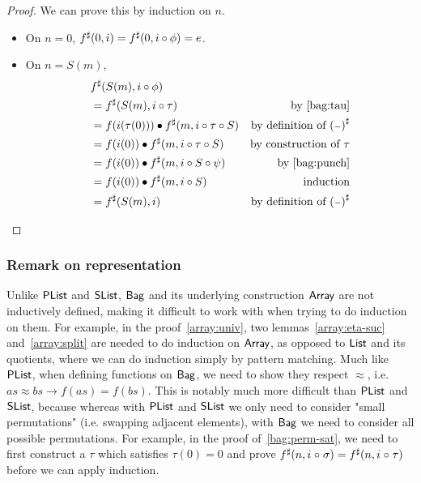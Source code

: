 \begin{proof}
    We can prove this by induction on $n$.
    \begin{itemize}
        \item On $n = 0$, $\ext{f}(0, i) \id \ext{f}(0, i \circ \phi) = e$.
        \item On $n = S(m)$,
              \begin{align*}
                   & \ext{f}(S(m), i \circ \phi)                                                                       \\
                   & = \ext{f}(S(m), i \circ \tau)                          & \text{by~\cref{bag:tau}}                 \\
                   & = f(i(\tau(0))) \mult \ext{f}(m, i \circ \tau \circ S) & \text{by definition of $\ext{(\blank)}$} \\
                   & = f(i(0)) \mult \ext{f}(m, i \circ \tau \circ S)       & \text{by construction of $\tau$}         \\
                   & = f(i(0)) \mult \ext{f}(m, i \circ S \circ \psi)       & \text{by~\cref{bag:punch}}               \\
                   & = f(i(0)) \mult \ext{f}(m, i \circ S)                  & \text{induction}                         \\
                   & = \ext{f}(S(m), i)                                     & \text{by definition of $\ext{(\blank)}$}
              \end{align*}
    \end{itemize}
\end{proof}

\subsubsection*{Remark on representation}\label{bag:rep}

Unlike $\operatorname{\mathsf{PList}}$ and $\operatorname{\mathsf{SList}}$, $\operatorname{\mathsf{Bag}}$ and its underlying construction $\operatorname{\mathsf{Array}}$ are not inductively defined,
making it difficult to work with when trying to do induction on them. For example,
in the proof~\cref{array:univ}, two lemmas~\cref{array:eta-suc} and~\cref{array:split} are needed to do
induction on $\operatorname{\mathsf{Array}}$, as opposed to $\operatorname{\mathsf{List}}$ and its quotients, where we can do induction simply by
pattern matching. Much like $\operatorname{\mathsf{PList}}$, when defining functions on $\operatorname{\mathsf{Bag}}$, we need to show they respect
$\approx$, i.e. $as \approx bs \to f(as) = f(bs)$. This is notably much more difficult than
$\operatorname{\mathsf{PList}}$ and $\operatorname{\mathsf{SList}}$, because whereas with $\operatorname{\mathsf{PList}}$ and $\operatorname{\mathsf{SList}}$ we only need to consider "small permutations"
(i.e. swapping adjacent elements), with $\operatorname{\mathsf{Bag}}$ we need to consider all possible permutations. For example,
in the proof of~\cref{bag:perm-sat}, we need to first construct a $\tau$ which satisfies $\tau(0) = 0$ and prove
${f}^{\sharp}(n, i \mathrel{\circ} \sigma) = {f}^{\sharp}(n, i \mathrel{\circ} \tau)$ before we can apply induction.

